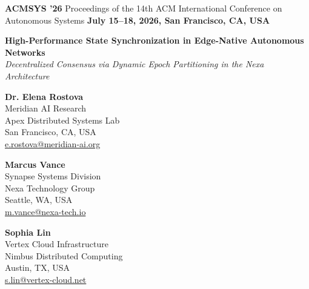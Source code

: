 \documentclass[10pt,a4paper]{article}
\begin{document}
\begin{tcolorbox}[colback=ACMHeaderBg,colframe=ACMBlue,arc=0pt,boxrule=0.6pt,top=4pt,bottom=4pt,left=8pt,right=8pt]
  \small\textcolor{ACMBlue}{\textbf{ACMSYS '26}} \textcolor{ACMDark}{\textbar{} Proceedings of the 14th ACM International Conference on Autonomous Systems} \hfill \textcolor{ACMBlue}{\textbf{July 15--18, 2026, San Francisco, CA, USA}}
\end{tcolorbox}

\vspace{4pt}

\begin{center}
  {\Huge\bfseries\color{ACMBlue} High-Performance State Synchronization in Edge-Native Autonomous Networks}\\[5pt]
  {\Large\itshape\color{ACMDark} Decentralized Consensus via Dynamic Epoch Partitioning in the Nexa Architecture}\\[10pt]
\end{center}

\noindent
\begin{minipage}[t]{0.32\textwidth}
  \centering
  \textbf{\color{ACMBlue} Dr. Elena Rostova}\\
  \small Meridian AI Research\\
  Apex Distributed Systems Lab\\
  San Francisco, CA, USA\\
  \href{mailto:e.rostova@meridian-ai.org}{\small e.rostova@meridian-ai.org}
\end{minipage}
\hfill
\begin{minipage}[t]{0.32\textwidth}
  \centering
  \textbf{\color{ACMBlue} Marcus Vance}\\
  \small Synapse Systems Division\\
  Nexa Technology Group\\
  Seattle, WA, USA\\
  \href{mailto:m.vance@nexa-tech.io}{\small m.vance@nexa-tech.io}
\end{minipage}
\hfill
\begin{minipage}[t]{0.32\textwidth}
  \centering
  \textbf{\color{ACMBlue} Sophia Lin}\\
  \small Vertex Cloud Infrastructure\\
  Nimbus Distributed Computing\\
  Austin, TX, USA\\
  \href{mailto:s.lin@vertex-cloud.net}{\small s.lin@vertex-cloud.net}
\end{minipage}
\end{document}
